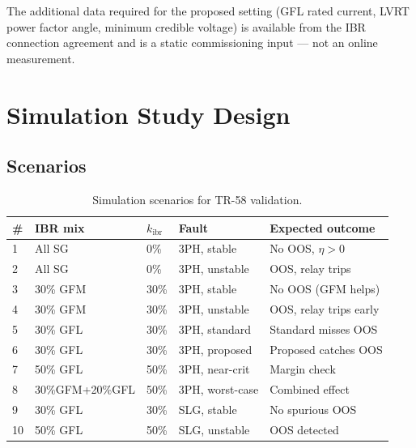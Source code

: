 \documentclass[11pt,a4paper]{article}
\begin{document}
The additional data required for the proposed setting (GFL rated current,
LVRT power factor angle, minimum credible voltage) is available from the IBR
connection agreement and is a static commissioning input — not an online
measurement.

\section{Simulation Study Design}
\label{sec:sim}

\subsection{Scenarios}

\begin{table}[ht]
  \centering
  \caption{Simulation scenarios for TR-58 validation.}
  \label{tab:scenarios}
  \begin{tabular}{lllll}
    \toprule
    \# & IBR mix & $k_{\mathrm{ibr}}$ & Fault & Expected outcome \\
    \midrule
    1 & All SG         & 0\%  & 3PH, stable    & No OOS, $\eta > 0$ \\
    2 & All SG         & 0\%  & 3PH, unstable  & OOS, relay trips \\
    3 & 30\% GFM       & 30\% & 3PH, stable    & No OOS (GFM helps) \\
    4 & 30\% GFM       & 30\% & 3PH, unstable  & OOS, relay trips early \\
    5 & 30\% GFL       & 30\% & 3PH, standard  & Standard misses OOS \\
    6 & 30\% GFL       & 30\% & 3PH, proposed  & Proposed catches OOS \\
    7 & 50\% GFL       & 50\% & 3PH, near-crit & Margin check \\
    8 & 30\%GFM+20\%GFL& 50\% & 3PH, worst-case & Combined effect \\
    9 & 30\% GFL       & 30\% & SLG, stable    & No spurious OOS \\
    10& 50\% GFL       & 50\% & SLG, unstable  & OOS detected \\
    \bottomrule
  \end{tabular}
\end{table}
\end{document}
